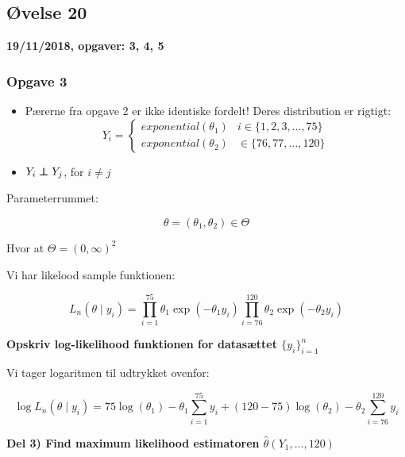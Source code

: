 \horizline

\subsection{Øvelse 20}

\textbf{19/11/2018, opgaver: 3, 4, 5}

\subsubsection{Opgave 3}

\begin{itemize}
    \item Pærerne fra opgave 2 er ikke identiske fordelt! Deres distribution er rigtigt:
    \begin{equation}
    Y_i =
    \begin{cases}
        exponential(\theta_1) & i \in \{ 1, 2, 3, \ldots, 75\} \\
        exponential(\theta_2) & \in \{ 76, 77, \ldots, 120\}
    \end{cases}
    \end{equation}
    \item $Y_i \independent Y_j$, for $i \neq j$
\end{itemize}

Parameterrummet:

\begin{equation}
\theta = (\theta_1 , \theta_2) \in \Theta
\end{equation}

Hvor at $\Theta = (0, \infty)^2$

Vi har likelood sample funktionen:

\begin{equation}
    L_n (\theta \mid y_i) = \prod_{i=1}^{75} \theta_1 \exp(- \theta_1 y_i) \prod_{i=76}^{120}\theta_2 \exp(- \theta_2 y_i)
\end{equation}

\textbf{Opskriv log-likelihood funktionen for datasættet $\{ y_i \}^{n}_{i=1}$}

Vi tager logaritmen til udtrykket ovenfor:

\begin{equation}
    \log L_n (\theta \mid y_i) = 75 \log(\theta_1) - \theta_1 \sum_{i=1}^{75}  y_i + (120 - 75)\log(\theta_2) - \theta_2 \sum_{i=76}^{120}  y_i
\end{equation}

\textbf{Del 3) Find maximum likelihood estimatoren $\hat{\theta}(Y_1 , \ldots, 120)$}

